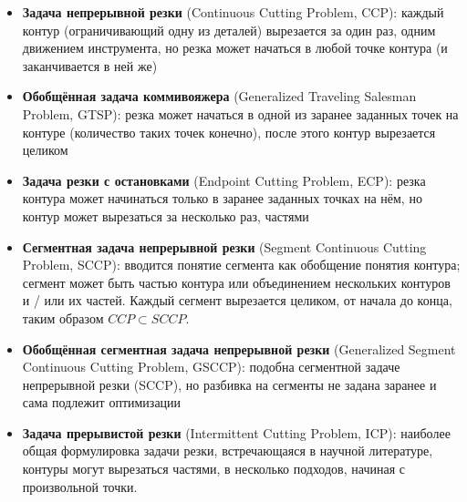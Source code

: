 \documentclass[14pt]{extarticle}
\theoremstyle{plain}%
\theoremstyle{remark}
\begin{document}
\begin{itemize}
  \item
  \textbf{Задача непрерывной резки}
  (Continuous Cutting Problem, CCP):
  каждый контур
  (ограничивающий одну из деталей)
  вырезается за один раз,
  одним движением инструмента,
  но резка может начаться в любой точке контура
  (и заканчивается в ней же)

  \item
  \textbf{Обобщённая задача коммивояжера}
  (Generalized Traveling Salesman Problem, GTSP):
  резка может начаться в одной из заранее
  заданных точек на контуре
  (количество таких точек конечно),
  после этого контур вырезается целиком

  \item
  \textbf{Задача резки с остановками}
  (Endpoint Cutting Problem, ECP):
  резка контура может начинаться только в
  заранее заданных точках на нём,
  но контур может вырезаться за несколько раз,
  частями

  \item
  \textbf{Сегментная задача непрерывной резки}
  (Segment Continuous Cutting Problem, SCCP):
  вводится понятие сегмента
  как обобщение понятия контура;
  сегмент может быть частью контура
  или объединением нескольких контуров
  и / или их частей.
  Каждый сегмент вырезается целиком,
  от начала до конца,
  таким образом
  $ CCP \subset SCCP$.

  \item
  \textbf{Обобщённая сегментная задача непрерывной резки}
  (Generalized Segment Continuous Cutting Problem, GSCCP):
  подобна сегментной задаче непрерывной резки
  (SCCP),
  но разбивка на сегменты не задана заранее
  и сама подлежит оптимизации

  \item
  \textbf{Задача прерывистой резки}
  (Intermittent Cutting Problem, ICP):
  наиболее общая формулировка задачи резки,
  встречающаяся в научной литературе,
  контуры могут вырезаться частями,
  в несколько подходов,
  начиная с произвольной точки.
\end{itemize}
\end{document}
